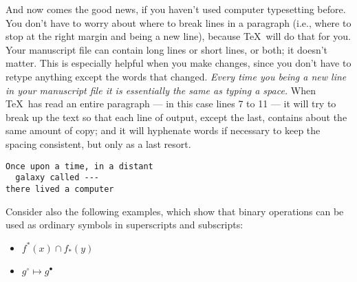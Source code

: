 \documentclass[11pt,letterpaper]{article}
\begin{document}
\sloppypar
And now comes the good news, if you haven't used
computer typesetting before. You don't have to worry about where to
break lines in a paragraph (i.e., where to stop at the right margin
and being a new line), because \TeX\ will do that for you.
Your manuscript file can contain long lines or short lines, or both;
it doesn't matter.
This is especially helpful when you make changes, since you
don't have to retype anything except the words that changed.
\textit{Every time you being a new line in your manuscript file 
it is essentially the same as typing a space.}
When \TeX\ has read an entire paragraph --- in this case lines
7 to 11 --- it will try to break up the text so that each line of output,
except the last, contains about the same amount of copy; and it will
hyphenate words if necessary to keep the spacing consistent, but only
as a last resort.
\newpage

\begin{verbatim}
Once upon a time, in a distant
  galaxy called ---
there lived a computer
\end{verbatim}

Consider also the following examples, which show that binary operations
can be used as ordinary symbols in superscripts and subscripts:

\begin{itemize}
\item $f^*(x) \cap f_*(y)$
\item $g^\circ \mapsto g^\bullet$
\end{itemize}
\end{document}
